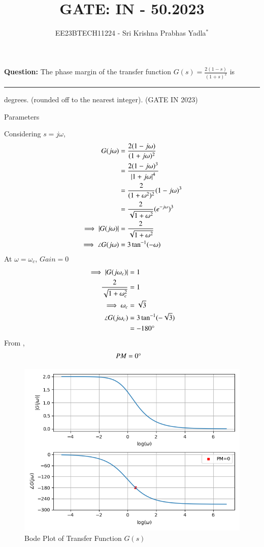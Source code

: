 \documentclass[journal,12pt,twocolumn]{IEEEtran}
\theoremstyle{remark}
\begin{document}

\vspace{3cm}

\title{GATE: IN - 50.2023}
\author{EE23BTECH11224 - Sri Krishna Prabhas Yadla$^{*}$%
}
\maketitle
\newpage
\bigskip

\renewcommand{\thefigure}{\arabic{figure}}
\renewcommand{\thetable}{\arabic{table}}


\vspace{3cm}
\textbf{Question:} The phase margin of the transfer function $G(s) = \frac{2(1-s)}{(1+s)^2}$ is \rule{1cm}{0.15mm} degrees. (rounded off to the nearest integer). \hfill (GATE IN 2023)\\
\solution
\begin{table}[htbp]
	\centering
	\def\arraystrech{1.5}
	
	\caption{Parameters}
	\label{tab:parameters}
\end{table}
\newline
Considering $s=j\omega$,
\begin{align}
	G(j\omega) &= \frac{2(1-j\omega)}{(1+j\omega)^2} \\
	&= \frac{2(1-j\omega)^3}{\left\vert1+j\omega\right\vert^4}\\
	&= \frac{2}{(1+\omega^2)^2}(1-j\omega)^3 \\
	&= \frac{2}{\sqrt{1+\omega^2}}(e^{-j\omega})^3 \\
	\implies \left\vert G(j\omega)\right\vert &= \frac{2}{\sqrt{1+\omega^2}} \\
	\implies \angle G(j\omega) &= 3\tan^{-1}(-\omega)
\end{align}
At $\omega = \omega_c$, $Gain = 0$
\begin{align}
	\implies \left\vert G(j\omega_c)\right\vert &= 1 \\
	\frac{2}{\sqrt{1+\omega_c^2}} &= 1 \\
	\implies \omega_c &= \sqrt{3} \\
	\angle G(j\omega_c) &= 3\tan^{-1}(-\sqrt{3}) \\
	&= -180\degree
\end{align}
From ,
\begin{align}
	PM &= 0\degree
\end{align}
\begin{figure}[htbp]
	\includegraphics[width=\columnwidth]{figs/bode.png}
	\caption{Bode Plot of Transfer Function $G(s)$}
	\label{fig:bode}
\end{figure}
\end{document}
